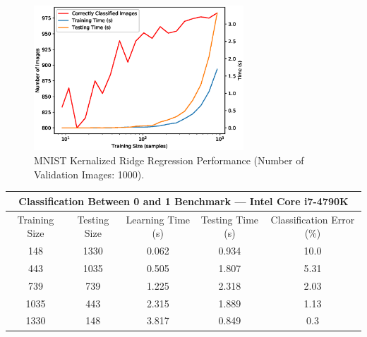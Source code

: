 \documentclass{article}[12pt]
\begin{document}
\begin{enumerate}
\begin{figure}[H]
\centering
\includegraphics[width=0.7\textwidth]{./img/mnist_perf.eps}
\caption{MNIST Kernalized Ridge Regression Performance (Number of Validation Images: 1000).}
\end{figure}

\begin{table}[h]
\centering
\begin{tabular}{|c|c|c|c|c|} \hline
\multicolumn{5}{|c|}{Classification Between 0 and 1 Benchmark --- Intel Core i7-4790K} \\ \hline
 Training Size & Testing Size & Learning Time (s) & Testing Time (s) & Classification Error (\%) \\ \hline \hline
  148 & 1330 & 0.062 & 0.934 & 10.0 \\ \hline
  443 & 1035 & 0.505 & 1.807 & 5.31 \\ \hline
  739 & 739 & 1.225 & 2.318 & 2.03 \\ \hline
  1035 & 443 & 2.315 & 1.889 & 1.13 \\ \hline
  1330 & 148 & 3.817 & 0.849 & 0.3 \\ \hline
\end{tabular}

\end{table}


\end{enumerate}
\end{document}
